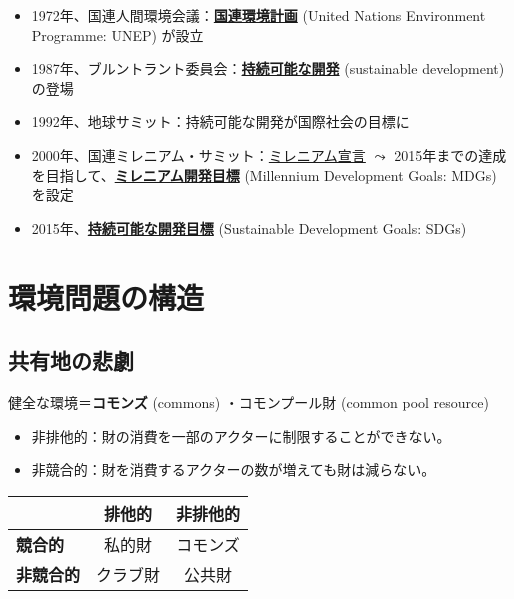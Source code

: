 \documentclass[
  xelatex,
  ja=standard]{bxjsarticle}
\providecommand{\tightlist}{%
  \setlength{\itemsep}{0pt}\setlength{\parskip}{0pt}}\usepackage{longtable,booktabs,array}
\begin{document}
\begin{itemize}
\tightlist
\item
  1972年、国連人間環境会議：\href{https://www.mofa.go.jp/mofaj/gaiko/kankyo/kikan/unep.html}{\textbf{国連環境計画}}
  (United Nations Environment Programme: UNEP) が設立
\item
  1987年、ブルントラント委員会：\href{https://www.unic.or.jp/activities/economic_social_development/sustainable_development/}{\textbf{持続可能な開発}}
  (sustainable development) の登場
\item
  1992年、地球サミット：持続可能な開発が国際社会の目標に
\item
  2000年、国連ミレニアム・サミット：\href{https://www.mofa.go.jp/mofaj/kaidan/kiroku/s_mori/arc_00/m_summit/sengen.html}{ミレニアム宣言}
  \(\leadsto\)
  2015年までの達成を目指して、\href{https://www.un.org/millenniumgoals/2015_MDG_Report/pdf/MDG\%202015\%20PC\%20final.pdf}{\textbf{ミレニアム開発目標}}
  (Millennium Development Goals: MDGs) を設定
\item
  2015年、\href{https://www.mofa.go.jp/mofaj/gaiko/oda/sdgs/index.html}{\textbf{持続可能な開発目標}}
  (Sustainable Development Goals: SDGs)
\end{itemize}

\hypertarget{ux74b0ux5883ux554fux984cux306eux69cbux9020}{%
\section{環境問題の構造}\label{ux74b0ux5883ux554fux984cux306eux69cbux9020}}

\hypertarget{ux5171ux6709ux5730ux306eux60b2ux5287}{%
\subsection{共有地の悲劇}\label{ux5171ux6709ux5730ux306eux60b2ux5287}}

健全な環境＝\textbf{コモンズ} (commons) ・コモンプール財 (common pool
resource)

\begin{itemize}
\tightlist
\item
  非排他的：財の消費を一部のアクターに制限することができない。
\item
  非競合的：財を消費するアクターの数が増えても財は減らない。
\end{itemize}

\begin{longtable}[]{@{}lcc@{}}
\toprule\noalign{}
& \textbf{排他的} & \textbf{非排他的} \\
\midrule\noalign{}
\endhead
\bottomrule\noalign{}
\endlastfoot
\textbf{競合的} & 私的財 & コモンズ \\
\textbf{非競合的} & クラブ財 & 公共財 \\
\end{longtable}
\end{document}
